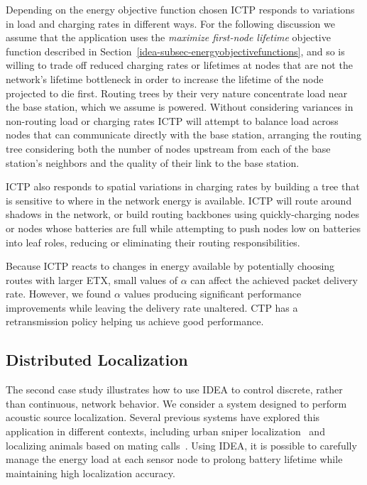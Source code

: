 Depending on the energy objective function chosen ICTP responds to variations
in load and charging rates in different ways. For the following discussion we
assume that the application uses the \textit{maximize first-node lifetime}
objective function described in
Section~\ref{idea-subsec-energyobjectivefunctions}, and so is willing to
trade off reduced charging rates or lifetimes at nodes that are not the
network's lifetime bottleneck in order to increase the lifetime of the node
projected to die first. Routing trees by their very nature concentrate load
near the base station, which we assume is powered. Without considering
variances in non-routing load or charging rates ICTP will attempt to balance
load across nodes that can communicate directly with the base station,
arranging the routing tree considering both the number of nodes upstream from
each of the base station's neighbors and the quality of their link to the
base station.

ICTP also responds to spatial variations in charging rates by building a tree
that is sensitive to where in the network energy is available. ICTP will
route around shadows in the network, or build routing backbones using
quickly-charging nodes or nodes whose batteries are full while attempting to
push nodes low on batteries into leaf roles, reducing or eliminating their
routing responsibilities.

\vfill\eject

Because ICTP reacts to changes in energy available by potentially choosing
routes with larger ETX, small values of $\alpha$ can affect the achieved
packet delivery rate. However, we found $\alpha$ values producing significant
performance improvements while leaving the delivery rate unaltered. CTP has a
retransmission policy helping us achieve good performance.

\subsection{Distributed Localization}

The second case study illustrates how to use IDEA to control discrete, rather
than continuous, network behavior. We consider a system designed to perform
acoustic source localization. Several previous systems have explored this
application in different contexts, including urban sniper
localization~\cite{shooter-localization} and localizing animals based on
mating calls~\cite{girod-marmots}. Using IDEA, it is possible to carefully
manage the energy load at each sensor node to prolong battery lifetime while
maintaining high localization accuracy.

